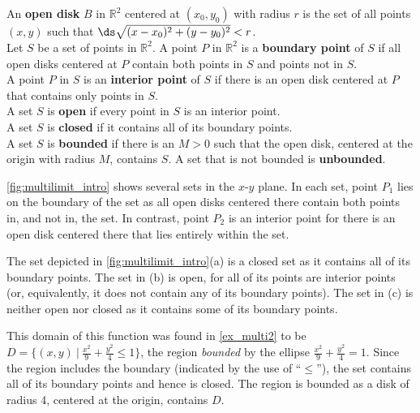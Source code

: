 {An \textbf{open disk} $B$ in $\mathbb{R}^2$ centered at $(x_0,y_0)$ with radius $r$ is the set of all points $(x,y)$ such that $\ds\sqrt{(x-x_0)^2+(y-y_0)^2} < r$. \\

Let $S$ be a set of points in $\mathbb{R}^2$. A point $P$ in $\mathbb{R}^2$ is a \textbf{boundary point} of $S$  if all open disks centered at $P$ contain both points in $S$ and points not in $S$.\\

A point $P$ in $S$ is an \textbf{interior point} of $S$ if there is an open disk centered at $P$ that contains only points in $S$.\\

A set $S$ is \textbf{open} if every point in $S$ is an interior point.\\

A set $S$ is \textbf{closed} if it contains all of its boundary points.\\

A set $S$ is \textbf{bounded} if there is an $M>0$ such that the open disk, centered at the origin with radius $M$, contains $S$. A set that is not bounded is \textbf{unbounded}.
}

\autoref{fig:multilimit_intro} shows several sets in the $x$-$y$ plane. In each set, point $P_1$ lies on the boundary of the set as all open disks centered there contain both points in, and not in, the set. In contrast, point $P_2$ is an interior point for there is an open disk centered there that lies entirely within the set.

The set depicted in \autoref{fig:multilimit_intro}(a) is a closed set as it contains all of its boundary points. The set in (b) is open, for all of its points are interior points (or, equivalently, it does not contain any of its boundary points). The set in (c) is neither open nor closed as it contains  some of its boundary points.

{This domain of this function was found in \autoref{ex_multi2} to be $D = \{(x,y)\ |\ \frac{x^2}9+\frac{y^2}4\leq 1\}$, the region \textit{bounded} by the ellipse $\frac{x^2}9+\frac{y^2}4=1$. Since the region includes the boundary (indicated by the use of ``$\leq$''), the set contains all of its boundary points and hence is closed. The region is bounded as a disk of radius 4, centered at the origin, contains $D$.}

